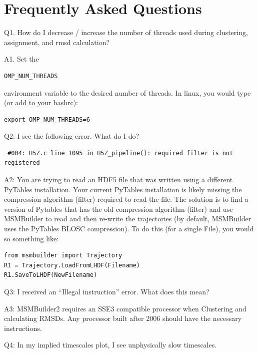\documentclass[12pt]{article}
\begin{document}
\newpage

\section{Frequently Asked Questions}

Q1.  How do I decrease / increase the number of threads used during clustering, assignment, and rmsd calculation?

A1.  Set the \begin{verbatim}OMP_NUM_THREADS\end{verbatim} environment variable to the desired number of threads.  In linux, you would type (or add to your bashrc):
\begin{verbatim}
export OMP_NUM_THREADS=6 
\end{verbatim}

\vspace{5mm}

Q2:  I see the following error.  What do I do?
\begin{verbatim}
 #004: H5Z.c line 1095 in H5Z_pipeline(): required filter is not registered
\end{verbatim}

A2:  You are trying to read an HDF5 file that was written using a different PyTables installation.  Your current PyTables installation is likely missing the compression algorithm (filter) required to read the file.  The solution is to find a version of Pytables that has the old compression algorithm (filter) and use MSMBuilder to read and then re-write the trajectories (by default, MSMBuilder uses the PyTables BLOSC compression).  To do this (for a single File), you would so something like:

\begin{verbatim}
from msmbuilder import Trajectory
R1 = Trajectory.LoadFromLHDF(Filename)
R1.SaveToLHDF(NewFilename)
\end{verbatim}

\vspace{5mm}

Q3: I received an “Illegal instruction” error.  What does this mean?

A3:  MSMBuilder2 requires an SSE3 compatible processor when Clustering and calculating RMSDs.  Any processor built after 2006 should have the necessary instructions.  

\vspace{5mm}

Q4:  In my implied timescales plot, I see unphysically slow timescales.  
\end{document}
